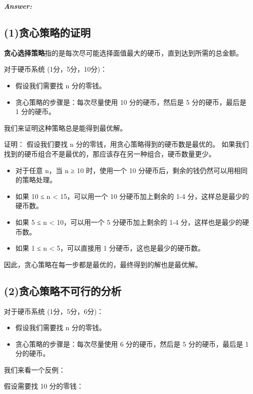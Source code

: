 \documentclass[12pt]{article}
\newenvironment{Answer}{
  \vspace{12pt}
  {\large\textbf{\textit{\hspace{-12pt}Answer:}}}\par
  \vspace{8pt}
} {\vspace{24pt}}
\begin{document}
\begin{Answer}
\subsection*{(1)贪心策略的证明}
\noindent

\textbf{贪心选择策略}指的是每次尽可能选择面值最大的硬币，直到达到所需的总金额。

对于硬币系统 (1分，5分，10分)：

\begin{itemize}
  \item 假设我们需要找 n 分的零钱。
  \item 贪心策略的步骤是：每次尽量使用 10 分的硬币，然后是 5 分的硬币，最后是 1 分的硬币。
\end{itemize}

我们来证明这种策略总是能得到最优解。

证明：
假设我们要找 n 分的零钱，用贪心策略得到的硬币数是最优的。
如果我们找到的硬币组合不是最优的，那应该存在另一种组合，硬币数量更少。

\begin{itemize}
  \item 对于任意 n，当 n ≥ 10 时，使用一个 10 分硬币后，剩余的钱仍然可以用相同的策略处理。
  \item 如果 10 ≤ n < 15，可以用一个 10 分硬币加上剩余的 1-4 分，这样总是最少的硬币数。
  \item 如果 5 ≤ n < 10，可以用一个 5 分硬币加上剩余的 1-4 分，这样也是最少的硬币数。
  \item 如果 1 ≤ n < 5，可以直接用 1 分硬币，这也是最少的硬币数。
\end{itemize}

因此，贪心策略在每一步都是最优的，最终得到的解也是最优解。

\subsection*{(2)贪心策略不可行的分析}
\noindent
对于硬币系统 (1分，5分，6分)：

\begin{itemize}
  \item 假设我们需要找 n 分的零钱。
  \item 贪心策略的步骤是：每次尽量使用 6 分的硬币，然后是 5 分的硬币，最后是 1 分的硬币。
\end{itemize}

我们来看一个反例：

假设需要找 10 分的零钱：


\end{Answer}
\end{document}
